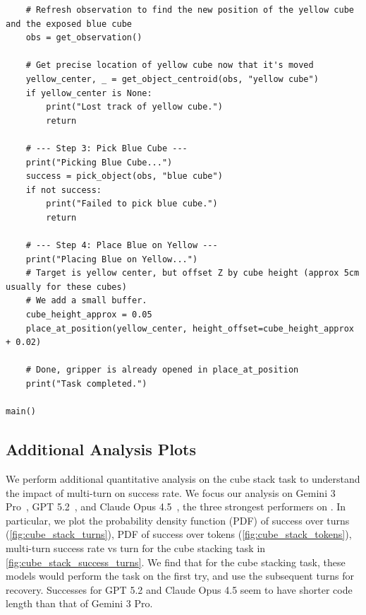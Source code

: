 \begin{lstlisting}
    # Refresh observation to find the new position of the yellow cube and the exposed blue cube
    obs = get_observation()
    
    # Get precise location of yellow cube now that it's moved
    yellow_center, _ = get_object_centroid(obs, "yellow cube")
    if yellow_center is None:
        print("Lost track of yellow cube.")
        return

    # --- Step 3: Pick Blue Cube ---
    print("Picking Blue Cube...")
    success = pick_object(obs, "blue cube")
    if not success:
        print("Failed to pick blue cube.")
        return

    # --- Step 4: Place Blue on Yellow ---
    print("Placing Blue on Yellow...")
    # Target is yellow center, but offset Z by cube height (approx 5cm usually for these cubes)
    # We add a small buffer.
    cube_height_approx = 0.05
    place_at_position(yellow_center, height_offset=cube_height_approx + 0.02)

    # Done, gripper is already opened in place_at_position
    print("Task completed.")

main()
\end{lstlisting}

\subsection{Additional Analysis Plots}
We perform additional quantitative analysis on the cube stack task to understand the impact of multi-turn on success rate. We focus our analysis on Gemini 3 Pro~\cite{google_deepmind_gemini3pro_modelcard_2025}, GPT 5.2~\cite{openai_gpt5_2_2025}, and Claude Opus 4.5~\cite{anthropic_claude_opus_4_5_2025}, the three strongest performers on \benchname{}. In particular, we plot the probability density function (PDF) of success over turns (\cref{fig:cube_stack_turns}), PDF of success over tokens (\cref{fig:cube_stack_tokens}), multi-turn success rate vs turn for the cube stacking task in \cref{fig:cube_stack_success_turns}. We find that for the cube stacking task, these models would perform the task on the first try, and use the subsequent turns for recovery. Successes for GPT 5.2 and Claude Opus 4.5 seem to have shorter code length than that of Gemini 3 Pro.

